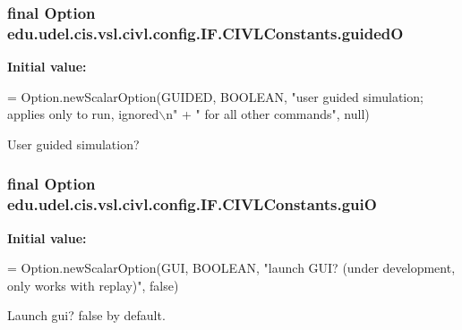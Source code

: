 \subsubsection[{guided\+O}]{\setlength{\rightskip}{0pt plus 5cm}final Option edu.\+udel.\+cis.\+vsl.\+civl.\+config.\+I\+F.\+C\+I\+V\+L\+Constants.\+guided\+O\hspace{0.3cm}{\ttfamily [static]}}\label{classedu_1_1udel_1_1cis_1_1vsl_1_1civl_1_1config_1_1IF_1_1CIVLConstants_a16a8c2d0190f4db9abd16181c6afb62a}
{\bfseries Initial value\+:}
\begin{DoxyCode}
= Option.newScalarOption(GUIDED,
            BOOLEAN, \textcolor{stringliteral}{"user guided simulation; applies only to run, ignored\(\backslash\)n"}
                    + \textcolor{stringliteral}{"    for all other commands"}, null)
\end{DoxyCode}


User guided simulation? 

\hypertarget{classedu_1_1udel_1_1cis_1_1vsl_1_1civl_1_1config_1_1IF_1_1CIVLConstants_a60e39f3b73f99f1a7756c4013b32ae7d}{}
\subsubsection[{gui\+O}]{\setlength{\rightskip}{0pt plus 5cm}final Option edu.\+udel.\+cis.\+vsl.\+civl.\+config.\+I\+F.\+C\+I\+V\+L\+Constants.\+gui\+O\hspace{0.3cm}{\ttfamily [static]}}\label{classedu_1_1udel_1_1cis_1_1vsl_1_1civl_1_1config_1_1IF_1_1CIVLConstants_a60e39f3b73f99f1a7756c4013b32ae7d}
{\bfseries Initial value\+:}
\begin{DoxyCode}
= Option.newScalarOption(GUI, BOOLEAN,
            \textcolor{stringliteral}{"launch GUI? (under development, only works with replay)"}, \textcolor{keyword}{false})
\end{DoxyCode}


Launch gui? false by default. 

\hypertarget{classedu_1_1udel_1_1cis_1_1vsl_1_1civl_1_1config_1_1IF_1_1CIVLConstants_a75d46ae43a99346dffc62bf4668c783b}{}
